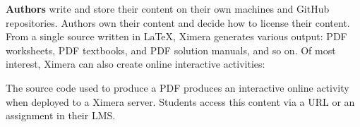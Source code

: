 \documentclass[twocolumn]{article}
\begin{document}
\begin{xframe}
    {\sffamily\bfseries Authors}  write and store their content on their own
    machines and GitHub repositories.
    Authors own their content and decide how to license their content. From a
    single source written in \LaTeX, Ximera generates various output: PDF
    worksheets,
    PDF textbooks, and	PDF solution manuals, and so on. Of most interest,
    Ximera can
    also create online interactive activities:
    \begin{center}
    \end{center}
    The source code used to produce a PDF produces an interactive online
    activity when deployed to  a Ximera server. Students access this content
    via a URL or an assignment in their
    LMS.
\end{xframe}
\end{document}
